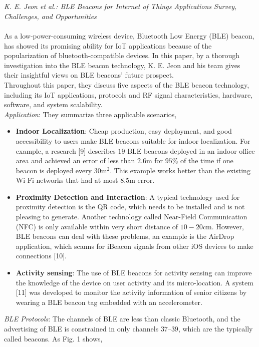 \documentclass[conference]{IEEEtran}
\begin{document}
\\
\\
\textit{K. E. Jeon et al.: BLE Beacons for Internet of Things Applications Survey, Challenges, and Opportunities}
\\
\\
\text{\quad} As a low-power-consuming wireless device, Bluetooth Low Energy (BLE) beacon, has showed its promising ability for IoT applications because of the popularization of bluetooth-compatible devices. In this paper, by a thorough investigation into the BLE beacon technology, K. E. Jeon and his team gives their insightful views on BLE beacons' future prospect.\\
\text{\quad} Throughout this paper, they discuss five aspects of the BLE beacon technology, including its IoT applications, protocols and RF signal characteristics, hardware, software, and system scalability.\\
\text{\quad} \textit{Application}: They summarize three applicable scenarios, 
\begin{itemize}
\item \textbf{Indoor Localization}: Cheap production, easy deployment, and good accessibility to users make BLE beacons suitable for indoor localization. For example, a research [9] describes $19$ BLE beacons deployed in an indoor office area and achieved an error of less than $2.6$m for $95$\% of the time if one beacon is deployed every $30$m$^2$. This example works better than the existing Wi-Fi networks that had at most $8.5$m error.
\item \textbf{Proximity Detection and Interaction}: A typical technology used for proximity detection is the QR code, which needs to be installed and is not pleasing to generate. Another technology called Near-Field Communication (NFC) is only available within very short distance of $10-20$cm. However, BLE beacons can deal with these problems, an example is the AirDrop application, which scanns for iBeacon signals from other iOS devices to make connections [10].
\item \textbf{Activity sensing}: The use of BLE beacons for activity sensing can improve the knowledge of the device on user activity and its micro-location. A system [11] was developed to monitor the activity information of senior citizens by wearing a BLE beacon tag embedded with an accelerometer.
\end{itemize}
\text{\quad} \textit{BLE Protocols}: The channels of BLE are less than classic Bluetooth, and the advertising of BLE is constrained in only channels $37–39$, which are the typically called beacons. As Fig. 1 shows, 
\end{document}

